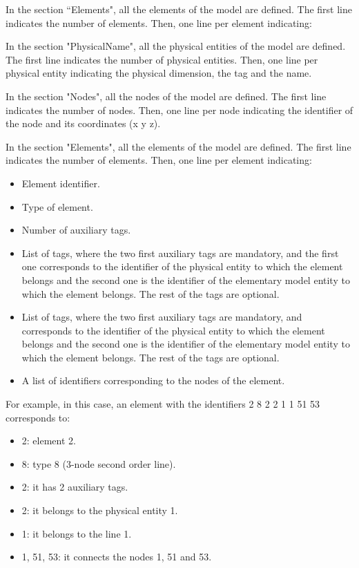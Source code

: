 \documentclass[a4]{article}
\begin{document}
In the section ``Elements", all the elements of the model are defined. The first line indicates the number of elements. Then, one line per element indicating:

In the section "PhysicalName", all the physical entities of the model are defined. The first line indicates the number of physical entities. Then, one line per physical entity indicating the physical dimension, the tag and the name.  

In the section "Nodes", all the nodes of the model are defined. The first line indicates the number of nodes. Then, one line per node indicating the identifier of the node and its coordinates (x y z).

In the section "Elements", all the elements of the model are defined. The first line indicates the number of elements. Then, one line per element indicating:


\begin{itemize}
	\item Element identifier.
	\item Type of element.
	\item Number of auxiliary tags.

	\item List of tags, where the two first auxiliary tags are mandatory, and the first one corresponds to the identifier of the physical entity to which the element belongs and the second one is the identifier of the elementary model entity to which the element belongs. The rest of the tags are optional.

	\item List of tags, where the two first auxiliary tags are mandatory, and corresponds to the identifier of the physical entity to which the element belongs and the second one is the identifier of the elementary model entity to which the element belongs. The rest of the tags are optional.

	\item A list of identifiers corresponding to the nodes of the element.
\end{itemize}

For example, in this case, an element with the identifiers 2 8 2 2 1 1 51 53 corresponds to:

\begin{itemize}
	\item 2: element 2.
	\item 8: type 8 (3-node second order line).
	\item 2: it has 2 auxiliary tags.
	\item 2: it belongs to the physical entity 1.
	\item 1: it belongs to the line 1.
	\item 1, 51, 53: it connects the nodes 1, 51 and 53.
\end{itemize} 
\end{document}
